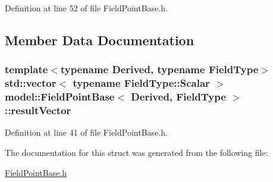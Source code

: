 Definition at line 52 of file Field\+Point\+Base.\+h.



\subsection{Member Data Documentation}
\hypertarget{structmodel_1_1_field_point_base_a4e28d7aa8e628b4b0bd6a58cd422ea78}{}
\subsubsection[{result\+Vector}]{\setlength{\rightskip}{0pt plus 5cm}template$<$typename Derived, typename Field\+Type$>$ std\+::vector$<$ typename Field\+Type\+::\+Scalar $>$ {\bf model\+::\+Field\+Point\+Base}$<$ Derived, Field\+Type $>$\+::result\+Vector\hspace{0.3cm}{\ttfamily [static]}}\label{structmodel_1_1_field_point_base_a4e28d7aa8e628b4b0bd6a58cd422ea78}


Definition at line 41 of file Field\+Point\+Base.\+h.



The documentation for this struct was generated from the following file\+:\begin{DoxyCompactItemize}
\item 
\hyperlink{_field_point_base_8h}{Field\+Point\+Base.\+h}\end{DoxyCompactItemize}
